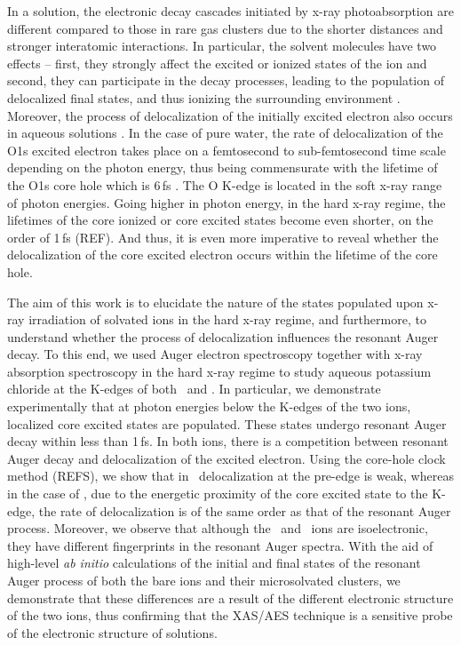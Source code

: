 In a solution, the electronic decay cascades initiated by x-ray photoabsorption are different compared to those in rare gas clusters due to the shorter distances and stronger interatomic interactions. In particular, the solvent molecules have two effects -- first, they strongly affect the excited \citep{miteva16:16671} or ionized states of the ion and second, they can participate in the decay processes, leading to the population of delocalized final states, and thus ionizing the surrounding environment \citep{Pokapanich09:7264,Pokapanich11:13430,Stumpf16:237}. Moreover, the process of delocalization of the initially excited electron also occurs in aqueous solutions \citep{Nordlund07:217406,Ottosson11:13489}.
In the case of pure water, the rate of delocalization of the O1s excited electron takes place on a femtosecond to sub-femtosecond time scale depending on the photon energy, thus being commensurate with the lifetime of the O1s core hole which is 6\,fs \citep{Nordlund07:217406}. The O K-edge is located in the soft x-ray range of photon energies. Going higher in photon energy, in the hard x-ray regime, the lifetimes of the core ionized or core excited states become even shorter, on the order of 1\,fs (REF). And thus, it is even more imperative to reveal whether the delocalization of the core excited electron occurs within the lifetime of the core hole.


The aim of this work is to elucidate the nature of the states populated upon x-ray irradiation of solvated ions in the hard x-ray regime, and furthermore, to understand whether the process of delocalization influences the resonant Auger decay. To this end, we used Auger electron spectroscopy together with x-ray absorption spectroscopy in the hard x-ray regime to study aqueous potassium chloride at the K-edges of both \ki~and \cli. In particular, we demonstrate experimentally that at photon energies below the K-edges of the two ions, localized core excited states are populated. These states undergo resonant Auger decay within less than 1\,fs. In both ions, there is a competition between resonant Auger decay and delocalization of the excited electron. Using the core-hole clock method (REFS), we show that in \ki~delocalization at the pre-edge is weak, whereas in the case of \cli, due to the energetic proximity of the core excited state to the K-edge, the rate of delocalization is of the same order as that of the resonant Auger process. Moreover, we observe that although the \ki~and \cli~ions are isoelectronic, they have different fingerprints in the resonant Auger spectra. With the aid of high-level {\it ab initio} calculations of the initial and final states of the resonant Auger process of both the bare ions and their microsolvated clusters, we demonstrate that these differences are a result of the different electronic structure of the two ions, thus confirming that the XAS/AES technique is a sensitive probe of the electronic structure of solutions.


